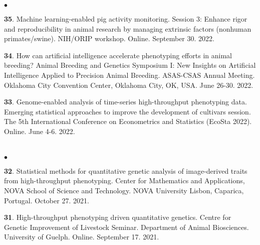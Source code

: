 \documentclass[margin,line,10pt]{res}
\newenvironment{list2}{
  \begin{list}{$\bullet$}{%
      \setlength{\itemsep}{0in}
      \setlength{\parsep}{0in} \setlength{\parskip}{0in}
      \setlength{\topsep}{0in} \setlength{\partopsep}{0in} 
      \setlength{\leftmargin}{0.2in}}}{\end{list}}
\begin{document}
\begin{resume}
\begin{list2}
\vspace{0.5cm}

\item [{\bf 35}.] Machine learning-enabled pig activity monitoring. Session 3: Enhance rigor and reproducibility in animal research by managing extrinsic factors (nonhuman primates/swine). NIH/ORIP workshop. Online. September 30. 2022.

\vspace{0.5cm}

\item [{\bf 34}.] How can artificial intelligence accelerate phenotyping efforts in animal breeding? Animal Breeding and Genetics Symposium I: New Insights on Artificial Intelligence Applied to Precision Animal Breeding. ASAS-CSAS Annual Meeting. Oklahoma City Convention Center, Oklahoma City, OK, USA. June 26-30. 2022.

\vspace{0.5cm}


\item [{\bf 33}.] Genome-enabled analysis of time-series high-throughput phenotyping data. Emerging statistical approaches to improve the development of cultivars session. The 5th International Conference on Econometrics and Statistics (EcoSta 2022). Online. June 4-6. 2022.

  
\end{list2}



\section{}
\begin{list2}

\item [{\bf 32}.] Statistical methods for quantitative genetic analysis of image-derived traits from high-throughput phenotyping. Center for Mathematics and Applications, NOVA School of Science and Technology. NOVA University Lisbon, Caparica, Portugal. October 27. 2021.

      \vspace{0.5cm}
  
 \item [{\bf 31}.] High-throughput phenotyping driven quantitative genetics. Centre for Genetic Improvement of Livestock Seminar. Department of Animal Biosciences. University of Guelph. Online. September 17. 2021.

\end{list2}


\end{resume}
\end{document}

